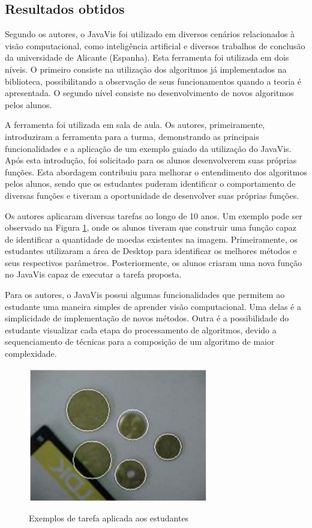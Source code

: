 \documentclass[
	12pt,				%
	oneside,			%
	a4paper,			%
	english,			%
	french,				%
	spanish,			%
	brazil,				%
	]{abntex2}
\begin{document}
\subsection{Resultados obtidos}

Segundo os autores, o JavaVis foi utilizado em diversos cenários relacionados à visão computacional, como inteligência artificial e diversos trabalhos de conclusão da universidade de Alicante (Espanha). Esta ferramenta foi utilizada em dois níveis. O primeiro consiste na utilização dos algoritmos já implementados na biblioteca, possibilitando a observação de seus funcionamentos quando a teoria é apresentada. O segundo nível consiste no desenvolvimento de novos algoritmos pelos alunos.

A ferramenta foi utilizada em sala de aula. Os autores, primeiramente, introduziram a ferramenta para a turma, demonstrando as principais funcionalidades e a aplicação de um exemplo guiado da utilização do JavaVis. Após esta introdução, foi solicitado para os alunos desenvolverem suas próprias funções. Esta abordagem contribuiu para melhorar o entendimento dos algoritmos pelos alunos, sendo que os estudantes puderam identificar o comportamento de diversas funções e tiveram a oportunidade de desenvolver suas próprias funções.

Os autores aplicaram diversas tarefas ao longo de 10 anos. Um exemplo pode ser observado na Figura \ref{fig:javavis_avaliacao}, onde os alunos tiveram que construir uma função capaz de identificar a quantidade de moedas existentes na imagem. Primeiramente, os estudantes utilizaram a área de Desktop para identificar os melhores métodos e seus respectivos parâmetros. Posteriormente, os alunos criaram uma nova função no JavaVis capaz de executar a tarefa proposta.

Para os autores, o JavaVis possui algumas funcionalidades que permitem ao estudante uma maneira simples de aprender visão computacional. Uma delas é a simplicidade de implementação de novos métodos. Outra é a possibilidade do estudante visualizar cada etapa do processamento de algoritmos, devido a sequenciamento de técnicas para a composição de um algoritmo de maior complexidade.

\begin{figure}[ht]
\centering
\caption{Exemplos de tarefa aplicada aos estudantes}
\includegraphics[width=0.7\textwidth]{imagens/javavis_avaliacao.png}
\label{fig:javavis_avaliacao}
\end{figure}
\end{document}
